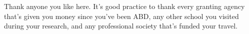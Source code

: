 Thank anyone you like here. It's good practice to thank every granting
agency that's given you money since you've been ABD, any other school
you visited during your research, and any professional society that's
funded your travel.
